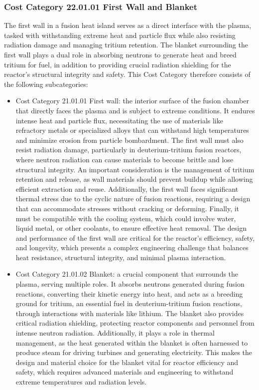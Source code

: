 \subsubsection*{Cost Category 22.01.01 First Wall and Blanket} 
\label{section:22.1.1}

The first wall in a fusion heat island serves as a direct interface with the plasma, tasked with withstanding extreme heat and particle flux while also resisting radiation damage and managing tritium retention. The blanket surrounding the first wall plays a dual role in absorbing neutrons to generate heat and breed tritium for fuel, in addition to providing crucial radiation shielding for the reactor's structural integrity and safety.  This Cost Category therefore consists of the following subcategories:


\begin{itemize}
    \item Cost Category 21.01.01 First wall: the interior surface of the fusion chamber that directly faces the plasma and is subject to extreme conditions. It endures intense heat and particle flux, necessitating the use of materials like refractory metals or specialized alloys that can withstand high temperatures and minimize erosion from particle bombardment. The first wall must also resist radiation damage, particularly in deuterium-tritium fusion reactors, where neutron radiation can cause materials to become brittle and lose structural integrity. An important consideration is the management of tritium retention and release, as wall materials should prevent buildup while allowing efficient extraction and reuse. Additionally, the first wall faces significant thermal stress due to the cyclic nature of fusion reactions, requiring a design that can accommodate stresses without cracking or deforming. Finally, it must be compatible with the cooling system, which could involve water, liquid metal, or other coolants, to ensure effective heat removal. The design and performance of the first wall are critical for the reactor's efficiency, safety, and longevity, which presents a complex engineering challenge that balances heat resistance, structural integrity, and minimal plasma interaction.
    \item Cost Category 21.01.02 Blanket: a crucial component that surrounds the plasma, serving multiple roles. It absorbs neutrons generated during fusion reactions, converting their kinetic energy into heat, and acts as a breeding ground for tritium, an essential fuel in deuterium-tritium fusion reactions, through interactions with materials like lithium. The blanket also provides critical radiation shielding, protecting reactor components and personnel from intense neutron radiation. Additionally, it plays a role in thermal management, as the heat generated within the blanket is often harnessed to produce steam for driving turbines and generating electricity. This makes the design and material choice for the blanket vital for reactor efficiency and safety, which requires advanced materials and engineering to withstand extreme temperatures and radiation levels.
\end{itemize}


